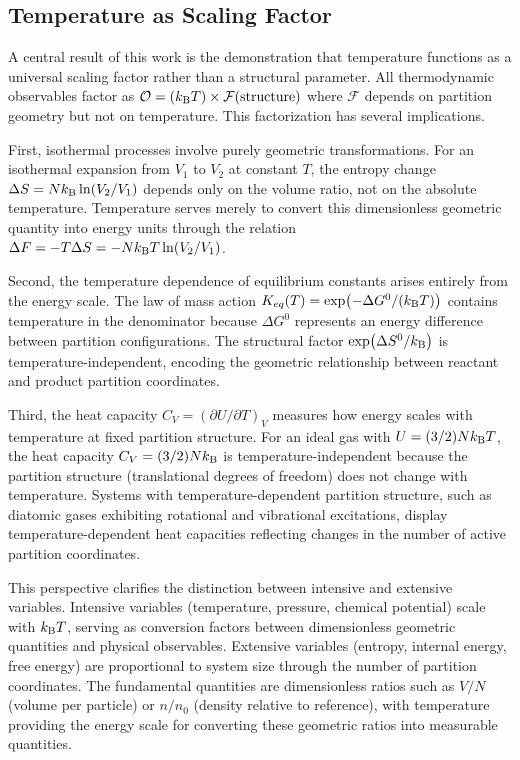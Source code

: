 \subsection{Temperature as Scaling Factor}

A central result of this work is the demonstration that temperature functions as a universal scaling factor rather than a structural parameter. All thermodynamic observables factor as $\mathcal{O} = (k_{\mathrm{B}} T) \times \mathcal{F}(\text{structure})$ where $\mathcal{F}$ depends on partition geometry but not on temperature. This factorization has several implications.

First, isothermal processes involve purely geometric transformations. For an isothermal expansion from $V_1$ to $V_2$ at constant $T$, the entropy change $\Delta S = Nk_{\mathrm{B}} \ln(V_2/V_1)$ depends only on the volume ratio, not on the absolute temperature. Temperature serves merely to convert this dimensionless geometric quantity into energy units through the relation $\Delta F = -T \Delta S = -Nk_{\mathrm{B}} T \ln(V_2/V_1)$.

Second, the temperature dependence of equilibrium constants arises entirely from the energy scale. The law of mass action $K_{eq}(T) = \exp(-\Delta G^0/(k_{\mathrm{B}} T))$ contains temperature in the denominator because $\Delta G^0$ represents an energy difference between partition configurations. The structural factor $\exp(\Delta S^0/k_{\mathrm{B}})$ is temperature-independent, encoding the geometric relationship between reactant and product partition coordinates.

Third, the heat capacity $C_V = (\partial U/\partial T)_V$ measures how energy scales with temperature at fixed partition structure. For an ideal gas with $U = (3/2)Nk_{\mathrm{B}} T$, the heat capacity $C_V = (3/2)Nk_{\mathrm{B}}$ is temperature-independent because the partition structure (translational degrees of freedom) does not change with temperature. Systems with temperature-dependent partition structure, such as diatomic gases exhibiting rotational and vibrational excitations, display temperature-dependent heat capacities reflecting changes in the number of active partition coordinates.

This perspective clarifies the distinction between intensive and extensive variables. Intensive variables (temperature, pressure, chemical potential) scale with $k_{\mathrm{B}} T$, serving as conversion factors between dimensionless geometric quantities and physical observables. Extensive variables (entropy, internal energy, free energy) are proportional to system size through the number of partition coordinates. The fundamental quantities are dimensionless ratios such as $V/N$ (volume per particle) or $n/n_0$ (density relative to reference), with temperature providing the energy scale for converting these geometric ratios into measurable quantities.

